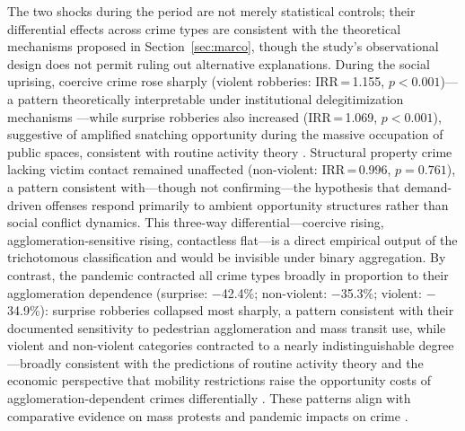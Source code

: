 \documentclass[pdflatex,sn-basic]{sn-jnl}
\begin{document}
The two shocks during the period are not merely statistical controls; their differential effects across crime types are consistent with the theoretical mechanisms proposed in Section~\ref{sec:marco}, though the study's observational design does not permit ruling out alternative explanations. During the social uprising, coercive crime rose sharply (violent robberies: IRR\,=\,1.155, $p<0.001$)---a pattern theoretically interpretable under institutional delegitimization mechanisms \citep{tyler2006,rosenfeld2021}---while surprise robberies also increased (IRR\,=\,1.069, $p<0.001$), suggestive of amplified snatching opportunity during the massive occupation of public spaces, consistent with routine activity theory \citep{cohen1979}. Structural property crime lacking victim contact remained unaffected (non-violent: IRR\,=\,0.996, $p=0.761$), a pattern consistent with---though not confirming---the hypothesis that demand-driven offenses respond primarily to ambient opportunity structures rather than social conflict dynamics. This three-way differential---coercive rising, agglomeration-sensitive rising, contactless flat---is a direct empirical output of the trichotomous classification and would be invisible under binary aggregation. By contrast, the pandemic contracted all crime types broadly in proportion to their agglomeration dependence (surprise: $-$42.4\%; non-violent: $-$35.3\%; violent: $-$34.9\%): surprise robberies collapsed most sharply, a pattern consistent with their documented sensitivity to pedestrian agglomeration and mass transit use, while violent and non-violent categories contracted to a nearly indistinguishable degree---broadly consistent with the predictions of routine activity theory \citep{cohen1979,ashby2020,stickle2020} and the economic perspective that mobility restrictions raise the opportunity costs of agglomeration-dependent crimes differentially \citep{becker1968}. These patterns align with comparative evidence on mass protests \citep{bell2014,mongale2022} and pandemic impacts on crime \citep{ashby2020,stickle2020}.
\end{document}
